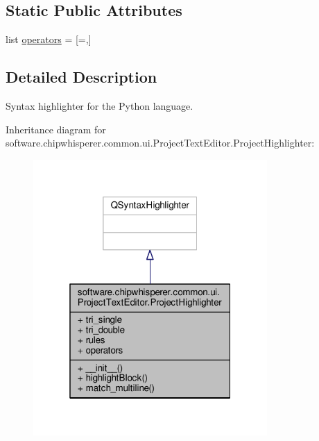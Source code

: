 \subsection*{Static Public Attributes}
\begin{DoxyCompactItemize}
\item 
list \hyperlink{classsoftware_1_1chipwhisperer_1_1common_1_1ui_1_1ProjectTextEditor_1_1ProjectHighlighter_ade0a5d97a53b350e1f84645a2b0bd6cb}{operators} = \mbox{[}\textquotesingle{}=\textquotesingle{},\mbox{]}
\end{DoxyCompactItemize}


\subsection{Detailed Description}
\begin{DoxyVerb}Syntax highlighter for the Python language.
\end{DoxyVerb}
 

Inheritance diagram for software.\+chipwhisperer.\+common.\+ui.\+Project\+Text\+Editor.\+Project\+Highlighter\+:\nopagebreak
\begin{figure}[H]
\begin{center}
\leavevmode
\includegraphics[width=253pt]{d6/d90/classsoftware_1_1chipwhisperer_1_1common_1_1ui_1_1ProjectTextEditor_1_1ProjectHighlighter__inherit__graph}
\end{center}
\end{figure}



